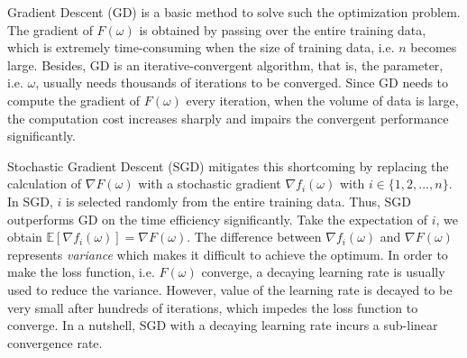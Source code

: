 \documentclass[conference]{IEEEtran}
\begin{document}
Gradient Descent (GD) is a basic method to solve such the optimization problem. The gradient of $F(\omega)$  is obtained by passing over the entire training data, which is extremely time-consuming when the size of training data, i.e. $n$ becomes large.  Besides, GD is an iterative-convergent algorithm, that is, the parameter, i.e. $\omega$, usually needs thousands of iterations to be converged.   Since GD needs to compute the  gradient of  $F(\omega)$ every iteration, when the volume of data is large, the computation cost increases sharply and impairs the convergent performance significantly. 

Stochastic Gradient Descent (SGD) mitigates this shortcoming by replacing the calculation of $\nabla F(\omega)$ with a stochastic gradient $\nabla f_i(\omega)$ with $i\in\{1,2, ..., n\}$. In SGD, $i$ is selected randomly  from the entire training data. Thus, SGD outperforms GD on the time efficiency significantly. Take the expectation of $i$, we obtain $\mathbb{E}[\nabla f_i(\omega)] = \nabla F(\omega)$. The difference between $\nabla f_i(\omega)$ and  $\nabla F(\omega)$ represents \emph{variance} which makes it difficult to achieve the optimum.  In order to make the loss function, i.e. $F(\omega)$ converge, a decaying learning rate is usually used to reduce the variance. However, value of the learning rate is decayed to be very small after hundreds of iterations, which impedes the loss function to converge. In a nutshell, SGD with a decaying learning rate incurs a sub-linear convergence rate.

\end{document}
